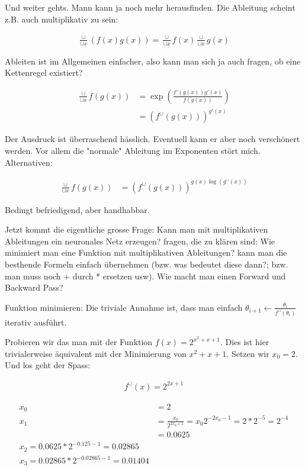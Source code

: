 \documentclass{article}
\begin{document}
Und weiter gehts. Mann kann ja noch mehr herausfinden. Die Ableitung scheint z.B. auch multiplikativ zu sein:

\begin{align}
    \frac{\cup}{\cup x}\left(f(x)g(x)\right) = \frac{\cup}{\cup x}f(x) \frac{\cup}{\cup x}g(x)
\end{align}

Ableiten ist im Allgemeinen einfacher, also kann man sich ja auch fragen, ob eine Kettenregel existiert?

\begin{align}
    \frac{\cup}{\cup x} f(g(x)) &= \exp\left(\frac{f'(g(x))g'(x)}{f(g(x))}\right) \\
    &= \left(f^{\cup}(g(x))\right)^{g'(x)}
\end{align}

Der Ausdruck ist überraschend hässlich. Eventuell kann er aber noch verschönert werden. Vor allem die "normale" Ableitung im Exponenten stört mich. Alternativen:

\begin{align}
    \frac{\cup}{\cup x} f(g(x)) &= \left(f^{\cup}(g(x))\right)^{g(x)\log(g^\cup(x))}
\end{align}

Bedingt befriedigend, aber handhabbar.

Jetzt kommt die eigentliche grosse Frage: Kann man mit multiplikativen Ableitungen ein neuronales Netz erzeugen? fragen, die zu klären sind: Wie minimiert man eine Funktion mit multiplikativen Ableitungen? kann man die besthende Formeln einfach übernehmen (bzw. was bedeutet diese dann?; bzw. man muss noch + durch * ersetzen usw). Wie macht man einen Forward und Backward Pass?

Funktion minimieren: Die triviale Annahme ist, dass man einfach $\theta_{i+1}\leftarrow \frac{\theta_i}{f^\cup(\theta_i)}$ iterativ ausführt.

Probieren wir das man mit der Funktion $f(x)=2^{x^2+x+1}$. Dies ist hier trivialerweise äquivalent mit der Minimierung von $x^2+x+1$. Setzen wir $x_0=2$. Und los geht der Spass:

\begin{align}
    f^\cup(x)=2^{2x+1}
\end{align}

\begin{align}
    x_0 &= 2 \\
    x_1 &= \frac{x_0}{2^{2x_0+1}} = x_0 2^{-2x_0-1} = 2 * 2^{-5} = 2^{-4} \\
    &= 0.0625 \\
    x_2 = 0.0625 * 2^{-0.125-1} = 0.02865 \\
    x_3 = 0.02865 * 2^{-0.02865-1} = 0.01404 
\end{align}
\end{document}
